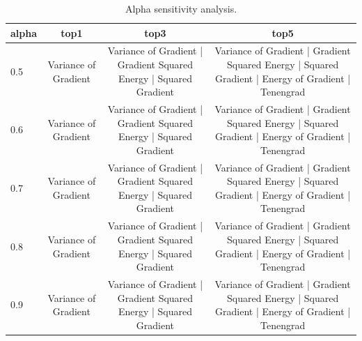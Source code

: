 \begin{table}[t]
\centering
\caption{Alpha sensitivity analysis.}
\begin{tabular}{lccc}
\hline
alpha & top1 & top3 & top5 \\
\hline
0.5 & Variance of Gradient & Variance of Gradient | Gradient Squared Energy | Squared Gradient & Variance of Gradient | Gradient Squared Energy | Squared Gradient | Energy of Gradient | Tenengrad \\
0.6 & Variance of Gradient & Variance of Gradient | Gradient Squared Energy | Squared Gradient & Variance of Gradient | Gradient Squared Energy | Squared Gradient | Energy of Gradient | Tenengrad \\
0.7 & Variance of Gradient & Variance of Gradient | Gradient Squared Energy | Squared Gradient & Variance of Gradient | Gradient Squared Energy | Squared Gradient | Energy of Gradient | Tenengrad \\
0.8 & Variance of Gradient & Variance of Gradient | Gradient Squared Energy | Squared Gradient & Variance of Gradient | Gradient Squared Energy | Squared Gradient | Energy of Gradient | Tenengrad \\
0.9 & Variance of Gradient & Variance of Gradient | Gradient Squared Energy | Squared Gradient & Variance of Gradient | Gradient Squared Energy | Squared Gradient | Energy of Gradient | Tenengrad \\
\hline
\end{tabular}
\end{table}